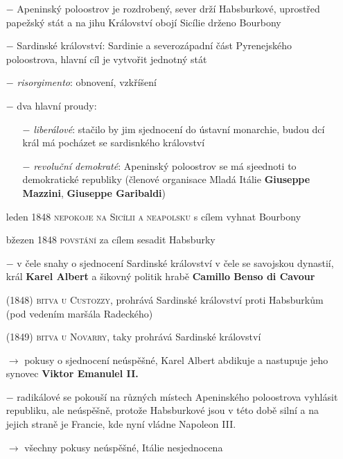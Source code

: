\documentclass{article}
\begin{document}
\begin{itemize}
    \vspace{-0.5em}
    \setlength\itemsep{0.15em}
    \item[$-$] Apeninský poloostrov je rozdrobený, sever drží Habsburkové, uprostřed papežský stát a na jihu Království obojí Sicílie drženo Bourbony
    \item[$-$] Sardinské království: Sardinie a severozápadní část Pyrenejského poloostrova, hlavní cíl je vytvořit jednotný stát
    \item[$-$] \textit{risorgimento}: obnovení, vzkříšení
    \item[$-$] dva hlavní proudy:
    \begin{itemize}
        \vspace{-0.5em}
        \setlength\itemsep{0.15em}
        \item[$-$] \textit{liberálové}: stačilo by jim sjednocení do ústavní monarchie, budou dcí král má pocházet se sardisnkého království
        \item[$-$] \textit{revoluční demokraté}: Apeninský poloostrov se má sjeednoti to demokratické republiky (členové organisace Mladá Itálie \textbf{Giuseppe Mazzini}, \textbf{Giuseppe Garibaldi})
    \end{itemize}
    \item[leden 1848] \textsc{nepokoje na Sicílii a neapolsku} s cílem vyhnat Bourbony
    \item[bžezen 1848] \textsc{povstání} za cílem sesadit Habsburky
    \item[$-$] v čele snahy o sjednocení Sardinské království v čele se savojskou dynastií, král \textbf{Karel Albert} a šikovný politik hrabě \textbf{Camillo Benso di Cavour}
    \item[(1848)] \textsc{bitva u Custozzy}, prohrává Sardinské království proti Habsburkům (pod vedením maršála Radeckého)
    \item[(1849)] \textsc{bitva u Novarry}, taky prohrává Sardinské království
    \item[$\rightarrow$] pokusy o sjednocení neúspěšné, Karel Albert abdikuje a nastupuje jeho synovec \textbf{Viktor Emanulel II.}
    \item[$-$] radikálové se pokouší na různých místech Apeninského poloostrova vyhlásit republiku, ale neúspěšně, protože Habsburkové jsou v této době silní a na jejich straně je Francie, kde nyní vládne Napoleon III.
    \item[$\rightarrow$] všechny pokusy neúspěšné, Itálie nesjednocena
\end{itemize}
\end{document}
